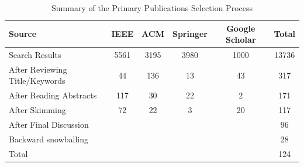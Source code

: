 \begin{table}
    \begin{tabular}{lccccc}
    \toprule
    Source                         & IEEE & ACM  & Springer & Google Scholar & Total \\
    \midrule
    Search Results                 & 5561 & 3195 & 3980     & 1000           & 13736 \\
    After Reviewing Title/Keywords & 44   & 136  & 13       & 43             & 317   \\
    After Reading Abstracts        & 117  & 30   & 22       & 2              & 171   \\
    After Skimming                 & 72   & 22   & 3        & 20             & 117   \\
    After Final Discussion         &      &      &          &                & 96    \\
    Backward snowballing           &      &      &          &                & 28    \\
    Total                          &      &      &          &                & 124    \\ 
    \bottomrule
    \end{tabular}
    \caption{Summary of the Primary Publications Selection Process}
    \label{tab:summary_slr}
\end{table}
    